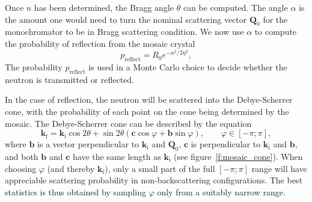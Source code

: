 Once $n$ has been determined, the Bragg angle $\theta$ can be
computed. The angle $\alpha$ is the amount one would need to
turn the nominal scattering vector $\textbf{Q}_0$ for the monochromator
to be in Bragg scattering condition.
We now use $\alpha$ to compute the probability of reflection from
the mosaic crystal
\begin{equation}
p_\textrm{reflect} = R_0 e^{-\alpha^2/2\eta^2},
\end{equation}
The probability $p_\textrm{reflect}$ is used
in a Monte Carlo choice to decide whether the neutron is transmitted or
reflected.
%

In the case of reflection, the neutron will be scattered into the
Debye-Scherrer cone, with the probability of each point on the cone
being determined by the mosaic. The Debye-Scherrer cone can be described
by the equation
\begin{equation}
  \label{eq:mosaic_cone}
  \textbf{k}_\textrm{f} = \textbf{k}_\textrm{i}\cos2\theta +
      \sin2\theta(\textbf{c}\cos\varphi + \textbf{b}\sin\varphi),
      \qquad\varphi\in[-\pi;\pi],
\end{equation}
where $\textbf{b}$ is a vector perpendicular to $\textbf{k}_\textrm{i}$ and $\textbf{
Q}_0$, $\textbf{c}$ is perpendicular to $\textbf{k}_\textrm{i}$ and $\textbf{b}$,
and both $\textbf{b}$ and $\textbf{c}$ have the same length as $\textbf{k}_\textrm{i}$
(see figure~\ref{f:mosaic_cone}). When choosing $\varphi$ (and
thereby $\textbf{k}_\textrm{f}$), only a small part of the full $[-\pi; \pi]$
range will have appreciable scattering probability in non-backscattering
configurations. The best statistics is thus obtained by sampling
$\varphi$ only from a suitably narrow range.

